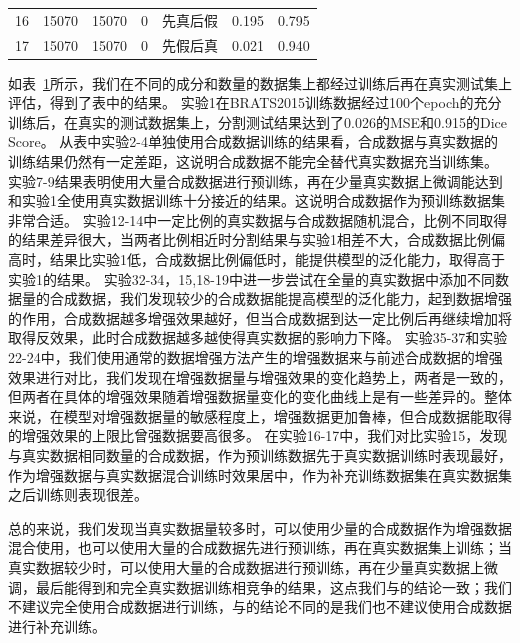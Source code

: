 \documentclass[letterpaper]{article} %
\begin{document}
\begin{table}[t]
{\begin{tabular}{lllllll}
			16& 15070 & 15070 &0  &先真后假 &0.195 &0.795 \\
			17& 15070 & 15070 &0  &先假后真 &0.021 &0.940 \\
			\bottomrule
		\end{tabular}
	}
	\label{use_test}
\end{table}
如表~\ref{use_test}所示，我们在不同的成分和数量的数据集上都经过训练后再在真实测试集上评估，得到了表中的结果。
实验1在BRATS2015训练数据经过100个epoch的充分训练后，在真实的测试数据集上，分割测试结果达到了0.026的MSE和0.915的Dice Score。
从表中实验2-4单独使用合成数据训练的结果看，合成数据与真实数据的训练结果仍然有一定差距，这说明合成数据不能完全替代真实数据充当训练集。
实验7-9结果表明使用大量合成数据进行预训练，再在少量真实数据上微调能达到和实验1全使用真实数据训练十分接近的结果。这说明合成数据作为预训练数据集非常合适。
实验12-14中一定比例的真实数据与合成数据随机混合，比例不同取得的结果差异很大，当两者比例相近时分割结果与实验1相差不大，合成数据比例偏高时，结果比实验1低，合成数据比例偏低时，能提供模型的泛化能力，取得高于实验1的结果。
实验32-34，15,18-19中进一步尝试在全量的真实数据中添加不同数据量的合成数据，我们发现较少的合成数据能提高模型的泛化能力，起到数据增强的作用，合成数据越多增强效果越好，但当合成数据到达一定比例后再继续增加将取得反效果，此时合成数据越多越使得真实数据的影响力下降。
实验35-37和实验22-24中，我们使用通常的数据增强方法产生的增强数据来与前述合成数据的增强效果进行对比，我们发现在增强数据量与增强效果的变化趋势上，两者是一致的，但两者在具体的增强效果随着增强数据量变化的变化曲线上是有一些差异的。整体来说，在模型对增强数据量的敏感程度上，增强数据更加鲁棒，但合成数据能取得的增强效果的上限比曾强数据要高很多。
在实验16-17中，我们对比实验15，发现与真实数据相同数量的合成数据，作为预训练数据先于真实数据训练时表现最好，作为增强数据与真实数据混合训练时效果居中，作为补充训练数据集在真实数据集之后训练则表现很差。

总的来说，我们发现当真实数据量较多时，可以使用少量的合成数据作为增强数据混合使用，也可以使用大量的合成数据先进行预训练，再在真实数据集上训练；当真实数据较少时，可以使用大量的合成数据进行预训练，再在少量真实数据上微调，最后能得到和完全真实数据训练相竞争的结果，这点我们与\cite{4shin2018medical}的结论一致；我们不建议完全使用合成数据进行训练，与\cite{4shin2018medical}的结论不同的是我们也不建议使用合成数据进行补充训练。
\end{document}
